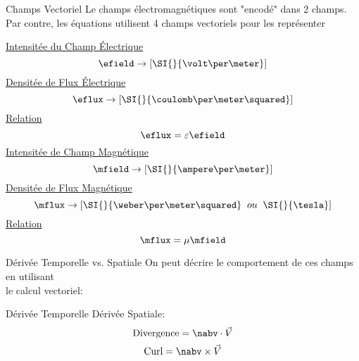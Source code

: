 \begin{frame}{Champs Vectoriel}
    \centering
    Le champs électromagnétiques sont "encodé" dans 2 champs. \\
    Par contre, les équations utilisent 4 champs vectoriels pour les représenter\\
    \vspace{15pt}
    \begin{twocolumns}[0.4]
        \leftcol
            \centering
            \underline{Intensitée du Champ Électrique}
            \begin{equation*}
                \efield \rightarrow [\SI{}{\volt\per\meter}]
            \end{equation*}
            \underline{Densitée de Flux Électrique}
            \begin{equation*}
                \eflux \rightarrow [\SI{}{\coulomb\per\meter\squared}]
            \end{equation*}
            \underline{Relation}
            \begin{equation*}
                \eflux = \varepsilon \efield
            \end{equation*}
        \rightcol
            \centering
            \underline{Intensitée de Champ Magnétique}
            \begin{equation*}
                \mfield \rightarrow [\SI{}{\ampere\per\meter}]
            \end{equation*}
            \underline{Densitée de Flux Magnétique}
            \begin{equation*}
                \mflux \rightarrow [\SI{}{\weber\per\meter\squared} \;\; ou \;\; \SI{}{\tesla}]
            \end{equation*}
            \underline{Relation}
            \begin{equation*}
                \mflux = \mu \mfield
            \end{equation*}
    \end{twocolumns}
\end{frame}

\begin{frame}{Dérivée Temporelle vs. Spatiale}
    \centering
    On peut décrire le comportement de ces champs en utilisant\\
    le calcul vectoriel:
    \vspace{15pt}
    \begin{twocolumns}[0.5]
        \leftcol
            Dérivée Temporelle
        \rightcol
           Dérivée Spatiale:
            \begin{equation}
                \text{Divergence} = \nabv \cdot \vec{V}
            \end{equation}
            \begin{equation}
                \text{Curl} = \nabv \times \vec{V}
            \end{equation}
    \end{twocolumns}
\end{frame}

